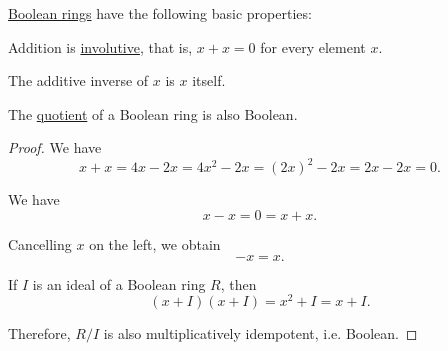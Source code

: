 \begin{proposition}\label{thm:def:boolean_ring}
  \hyperref[def:boolean_ring]{Boolean rings} have the following basic properties:
  \begin{thmenum}
     Addition is \hyperref[def:categorical_involution]{involutive}, that is, \( x + x = 0 \) for every element \( x \).

     The additive inverse of \( x \) is \( x \) itself.

     The \hyperref[def:ring/quotient]{quotient} of a Boolean ring is also Boolean.
  \end{thmenum}
\end{proposition}
\begin{proof}
   We have
  \begin{equation*}
    x + x
    =
    4x - 2x
    =
    4x^2 - 2x
    =
    (2x)^2 - 2x
    =
    2x - 2x
    =
    0.
  \end{equation*}

   We have
  \begin{equation*}
    x - x = 0 = x + x.
  \end{equation*}

  Cancelling \( x \) on the left, we obtain
  \begin{equation*}
    -x = x.
  \end{equation*}

   If \( I \) is an ideal of a Boolean ring \( R \), then
  \begin{equation*}
    (x + I)(x + I) = x^2 + I = x + I.
  \end{equation*}

  Therefore, \( R / I \) is also multiplicatively idempotent, i.e. Boolean.
\end{proof}


